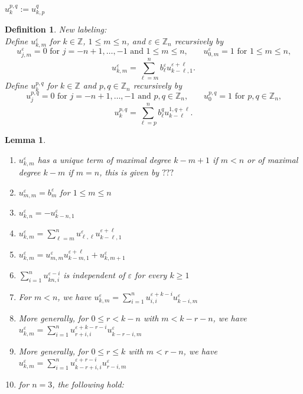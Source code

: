 \documentclass{amsart}
\newtheorem{definition}[theorem]{Definition}
\newtheorem{lemma}[theorem]{Lemma}
\numberwithin{theorem}{section}
\newcommand{\ZZ}{\mathbb{Z}}
\begin{document}
  $u^{p,q}_{k}:=u_{k,p}^q$
  \begin{definition}
    New labeling:\\
    Define $u_{k,m}^\varepsilon$ for $k\in\ZZ$, $1\le m\le n$, and $\varepsilon\in\ZZ_n$ recursively by
    \[u_{j,m}^\varepsilon = 0 \text{ for $j=-n+1,\ldots,-1$ and $1\le m\le n$,} \qquad u_{0,m}^\varepsilon = 1 \text{ for $1\le m\le n$,}\]
    \[u_{k,m}^\varepsilon = \sum\limits_{\ell=m}^n b_\ell^\varepsilon u_{k-\ell,1}^{\varepsilon+\ell}.\]
    Define $u_{k}^{p,q}$ for $k\in\ZZ$ and $p,q\in\ZZ_n$ recursively by
    \[u_{j}^{p,q} = 0 \text{ for $j=-n+1,\ldots,-1$ and $p,q\in\ZZ_n$,} \qquad u_{0}^{p,q} = 1 \text{ for $p,q\in\ZZ_n$,}\]
    \[u_{k}^{p,q} = \sum\limits_{\ell=p}^n b_\ell^q u_{k-\ell}^{1,q+\ell}.\]
  \end{definition}
  \begin{lemma}
    \mbox{}
    \begin{enumerate}
      \item $u_{k,m}^\varepsilon$ has a unique term of maximal degree $k-m+1$ if $m<n$ or of maximal degree $k-m$ if $m=n$, this is given by $???$
      \item $u_{m,m}^\varepsilon = b_m^\varepsilon$ for $1\le m\le n$
      \item $u_{k,n}^\varepsilon = -u_{k-n,1}^\varepsilon$
      \item \label{itm:standard} $u_{k,m}^\varepsilon = \sum\limits_{\ell=m}^n u_{\ell,\ell}^\varepsilon u_{k-\ell,1}^{\varepsilon+\ell}$
      \item \label{itm:one step standard} $u_{k,m}^\varepsilon = u_{m,m}^\varepsilon u_{k-m,1}^{\varepsilon+\ell} + u_{k,m+1}^\varepsilon$
      \item $\sum\limits_{i=1}^{n} u_{kn,i}^{\varepsilon-i}$ is independent of $\varepsilon$ for every $k\ge1$
      \item \label{itm:modified} For $m<n$, we have $u_{k,m}^\varepsilon = \sum\limits_{i=1}^n u_{i,i}^{\varepsilon+k-i} u_{k-i,m}^\varepsilon$
      \item \label{itm:r shifted recursion og} More generally, for $0\le r<k-n$ with $m<k-r-n$, we have $u_{k,m}^\varepsilon = \sum\limits_{i=1}^n u_{r+i,i}^{\varepsilon+k-r-i} u_{k-r-i,m}^\varepsilon$
      \item \label{itm:r shifted recursion} More generally, for $0\le r\le k$ with $m<r-n$, we have $u_{k,m}^\varepsilon = \sum\limits_{i=1}^n u_{k-r+i,i}^{\varepsilon+r-i} u_{r-i,m}^\varepsilon$
      \item for $n=3$, the following hold:

\end{enumerate}
\end{lemma}
\end{document}
